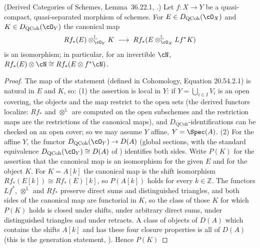 \begin{lemma}
\label{lem:pc-projection-formula}
(Derived Categories of Schemes, Lemma~36.22.1,
.)  Let
$f:X\to Y$ be a quasi-compact, quasi-separated morphism of schemes.
For $E\in D_{\text{QCoh}}(\cO_X)$ and $K\in D_{\text{QCoh}}(\cO_Y)$ the
canonical map
\[
Rf_*(E)\otimes_{\cO_Y}^{\mathbb L}K\;\longrightarrow\;
Rf_*(E\otimes_{\cO_X}^{\mathbb L}Lf^*K)
\]
is an isomorphism; in particular, for an invertible
 $\cN$,
$Rf_*(E)\otimes\cN\cong Rf_*(E\otimes f^*\cN)$.
\end{lemma}
\begin{proof}
The map of the statement (defined in Cohomology, Equation 20.54.2.1) is
natural in $E$ and $K$, so: (1) the assertion is local in $Y$: if
$Y=\bigcup_{i\in I}V_i$ is an open covering, the objects and the map
restrict to the open sets (the derived functors localize: $Rf_*$ and
$\otimes^{\mathbb L}$ are computed on the open subschemes and the
restriction maps are the restrictions of the canonical maps), and
$D_{\text{QCoh}}$-identifications can be checked on an open cover; so
we may assume $Y$ affine, $Y=\Spec(A)$.  (2) For the affine $Y$, the
functor $D_{\text{QCoh}}(\cO_Y)\to D(A)$ (global sections, with the
standard equivalence $D_{\text{QCoh}}(\cO_Y)\cong D(A)$ of
) identifies both
sides.  Write $P(K)$ for the assertion that the canonical map is an
isomorphism for the given $E$ and for the object $K$.  For $K=A[k]$ the
canonical map is the shift isomorphism $Rf_*(E[k])\cong Rf_*(E)[k]$, so
$P(A[k])$ holds for every $k\in\mathbb Z$.  The functors $Lf^*$,
$\otimes^{\mathbb L}$ and $Rf_*$ preserve direct sums and distinguished
triangles, and both sides of the canonical map are functorial in $K$, so
the class of those $K$ for which $P(K)$ holds is closed under shifts,
under arbitrary direct sums, under distinguished triangles and under
retracts.  A class of objects of $D(A)$ which contains the shifts $A[k]$
and has these four closure properties is all of $D(A)$ (this is the
generation statement,
).  Hence $P(K)$

\end{proof}
